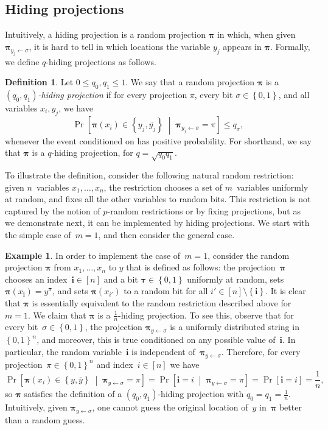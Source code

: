 \documentclass[11pt]{article}
\numberwithin{equation}{section}
\theoremstyle{definition}
\newtheorem{definition}[theorem]{Definition}
\newtheorem{example}[theorem]{Example}
\theoremstyle{plain}
\theoremstyle{definition}\newtheorem{notation}[theorem]{Notation}\theoremstyle{plain}
\newcommand{\B}{\left\{ 0,1 \right \}}
\newcommand{\p}{\boldsymbol{\pi}}
\newcommand{\btau}{\boldsymbol{\tau}}
\renewcommand{\i}{\boldsymbol{i}}
\theoremstyle{definition}
\theoremstyle{plain}
\begin{document}
\subsection{\label{subsec:Hiding-projections}Hiding projections}

Intuitively, a hiding projection is a random projection $\p$ in which,
when given $\p_{y_{j}\gets\sigma}$, it is hard to tell in which locations
the variable $y_{j}$ appears in $\p$. Formally, we define $q$-hiding
projections as follows. 
\begin{definition}
\label{def:hiding-projections}Let $0\leq q_{0},q_{1}\leq1$. We say that
a random projection $\p$ is a \emph{$(q_{0},q_{1})$-hiding projection}
if for every projection $\pi$, every bit $\sigma\in\B$, and all
variables $x_{i},y_{j}$, we have 
\[
\Pr\!\left[\p(x_{i})\in\left\{ y_{j},\overline{y_{j}}\right\} \;\middle|\;\p_{y_{j}\gets\sigma}=\pi\right]\leq q_{\sigma},
\]
whenever the event conditioned on has positive probability. For shorthand,
we say that $\p$ is a $q$-hiding projection, for $q=\sqrt{q_{0}q_{1}}$. 
\end{definition}

\noindent To illustrate the definition, consider the following natural
random restriction: given $n$~variables $x_{1},\ldots,x_{n}$, the
restriction chooses a set of $m$~variables uniformly at random,
and fixes all the other variables to random bits. This restriction
is not captured by the notion of $p$-random restrictions or by fixing
projections, but as we demonstrate next, it can be implemented by
hiding projections. We start with the simple case of~$m=1$, and
then consider the general case. 
\begin{example}
\label{ex:random-edge}In order to implement the case of~$m=1$, consider
the random projection $\p$ from $x_{1},\ldots,x_{n}$ to $y$ that
is defined as follows: the projection~$\p$ chooses an index~$\i\in\left[n\right]$
and a bit $\btau\in\B$ uniformly at random, sets $\p(x_{\i})=y^{\btau}$,
and sets $\p(x_{i'})$ to a random bit for all $i'\in\left[n\right]\setminus\left\{ \i\right\} $.
It is clear that $\p$ is essentially equivalent to the random restriction
described above for~$m=1$. We claim that $\p$ is a $\frac{1}{n}$-hiding
projection. To see this, observe that for every bit~$\sigma\in\B$,
the projection $\p_{y\gets\sigma}$ is a uniformly distributed string
in~$\B^{n}$, and moreover, this is true conditioned on any possible
value of~$\i$. In particular, the random variable~$\i$ is independent
of~$\p_{y\gets\sigma}$. Therefore, for every projection~$\pi\in\B^{n}$
and index~$i\in\left[n\right]$ we have 
\[
\Pr\!\left[\p(x_{i})\in\left\{ y,\overline{y}\right\} \;\middle|\;\p_{y\gets\sigma}=\pi\right]=\Pr\!\left[\i=i\;\middle|\;\p_{y\gets\sigma}=\pi\right]=\Pr\!\left[\i=i\right]=\frac{1}{n},
\]
so $\p$ satisfies the definition of a $(q_{0},q_{1})$-hiding projection
with $q_{0}=q_{1}=\frac{1}{n}$. Intuitively, given $\p_{y\gets\sigma}$,
one cannot guess the original location of~$y$ in~$\p$ better than
a random guess.
\end{example}
\end{document}
